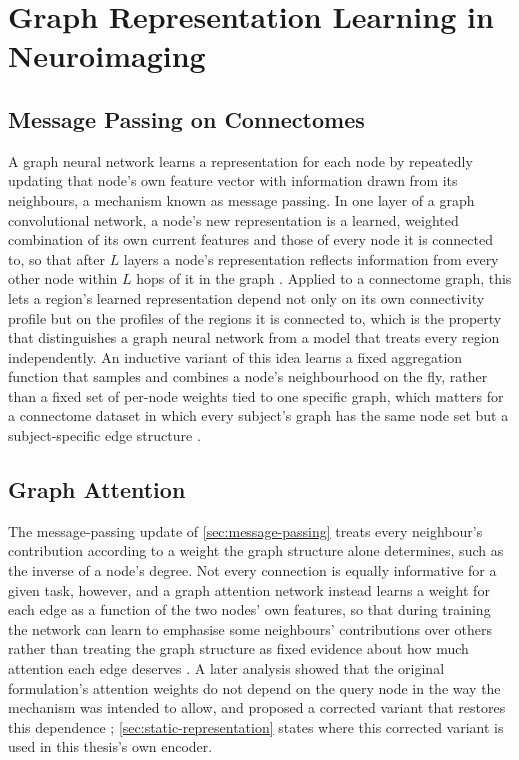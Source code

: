 \section{Graph Representation Learning in Neuroimaging}\label{sec:graph-learning}

\subsection{Message Passing on Connectomes}\label{sec:message-passing}

A graph neural network learns a representation for each node by repeatedly updating that
node's own feature vector with information drawn from its neighbours, a mechanism known as
message passing. In one layer of a graph convolutional network, a node's new
representation is a learned, weighted combination of its own current features and those of
every node it is connected to, so that after $L$ layers a node's representation reflects
information from every other node within $L$ hops of it in the graph
\parencite{kipf2017gcn}. Applied to a connectome graph, this lets a region's learned
representation depend not only on its own connectivity profile but on the profiles of the
regions it is connected to, which is the property that distinguishes a graph neural network
from a model that treats every region independently. An inductive variant of this idea
learns a fixed aggregation function that samples and combines a node's neighbourhood on the
fly, rather than a fixed set of per-node weights tied to one specific graph, which matters
for a connectome dataset in which every subject's graph has the same node set but a
subject-specific edge structure \parencite{hamilton2017graphsage}.

\subsection{Graph Attention}\label{sec:graph-attention}

The message-passing update of \autoref{sec:message-passing} treats every neighbour's
contribution according to a weight the graph structure alone determines, such as the
inverse of a node's degree. Not every connection is equally informative for a given task,
however, and a graph attention network instead learns a weight for each edge as a function
of the two nodes' own features, so that during training the network can learn to emphasise
some neighbours' contributions over others rather than treating the graph structure as
fixed evidence about how much attention each edge deserves \parencite{velickovic2018gat}.
A later analysis showed that the original formulation's attention weights do not depend on
the query node in the way the mechanism was intended to allow, and proposed a corrected
variant that restores this dependence \parencite{brody2022gatv2}; \autoref{sec:static-representation}
states where this corrected variant is used in this thesis's own encoder.

